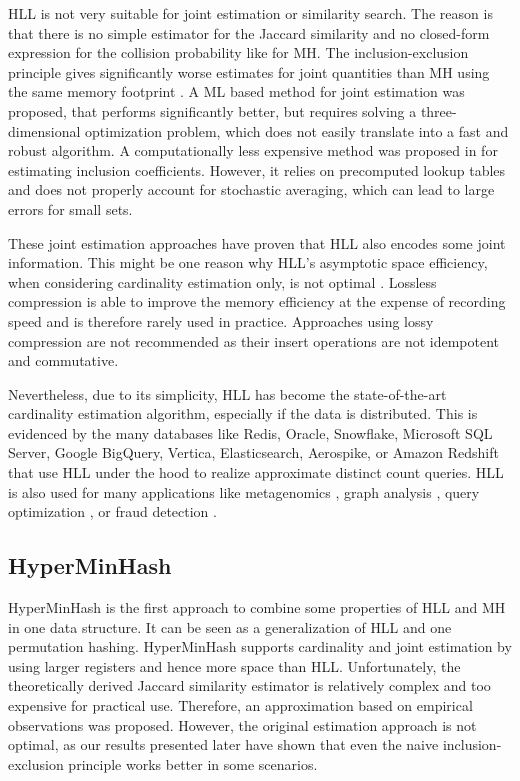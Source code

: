 \documentclass[sigconf, nonacm]{acmart}
\begin{document}
\ac{HLL} is not very suitable for joint estimation or similarity search. The reason is that there is no simple estimator for the Jaccard similarity and no closed-form expression for the collision probability like for \ac{MH}. The inclusion-exclusion principle gives significantly worse estimates for joint quantities than \ac{MH} using the same memory footprint \cite{Dasgupta2016}. A \ac{ML} based method \cite{Ertl2017, Ertl2017a} for joint estimation was proposed, that performs significantly better, but requires solving a three-dimensional optimization problem, which does not easily translate into a fast and robust algorithm. 
A computationally less expensive method was proposed in \cite{Nazi2018} for estimating inclusion coefficients. However, it relies on precomputed lookup tables and does not properly account for stochastic averaging, which can lead to large errors for small sets.

These joint estimation approaches have proven that \ac{HLL} also encodes some joint information. This might be one reason why \ac{HLL}'s asymptotic space efficiency, when considering cardinality estimation only, is not optimal \cite{Pettie2020,Pettie2020a}. 
Lossless compression \cite{Durand2004, Scheuermann2007, Lang2017} is able to improve the memory efficiency at the expense of recording speed and is therefore rarely used in practice. Approaches using lossy compression \cite{Xiao2020} are not recommended as their insert operations are not idempotent and commutative.

Nevertheless, due to its simplicity, \ac{HLL} has become the state-of-the-art cardinality estimation algorithm, especially if the data is distributed. This is evidenced by the many databases like Redis, Oracle, Snowflake, Microsoft SQL Server, Google BigQuery, Vertica, Elasticsearch, Aerospike, or Amazon Redshift that use \ac{HLL} under the hood to realize approximate distinct count queries. \ac{HLL} is also used for many applications like metagenomics \cite{Baker2019, Marcais2019, Elworth2020}, graph analysis \cite{Boldi2011, Priest2018, Priest2020}, query optimization \cite{Freitag2019}, or fraud detection \cite{Chabchoub2014}.

\subsection{HyperMinHash}
\label{sec:hyperminhash_intro}
HyperMinHash \cite{Yu2020} is the first approach to combine some properties of \ac{HLL} and \ac{MH} in one data structure. It can be seen as a generalization of \ac{HLL} and one permutation hashing. HyperMinHash supports cardinality and joint estimation by using larger registers and hence more space than \ac{HLL}. Unfortunately, the theoretically derived Jaccard similarity estimator is relatively complex and too expensive for practical use. Therefore, an approximation based on empirical observations was proposed.
However, the original estimation approach is not optimal, as our results presented later have shown that even the naive inclusion-exclusion principle works better in some scenarios.
\end{document}
